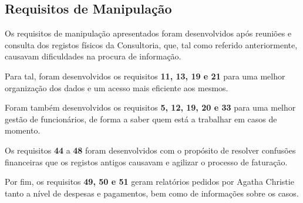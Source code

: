 \documentclass[a4paper,12pt]{scrreprt}
\begin{document}
        \clearpage


         \subsection{Requisitos de Manipulação}
         Os requisitos de manipulação apresentados foram desenvolvidos após reuniões e consulta dos registos físicos da Consultoria, que, tal como referido anteriormente, causavam dificuldades na procura de informação.
         
         Para tal, foram desenvolvidos os requisitos \textbf{11, 13, 19 e 21} para uma melhor organização dos dados e um acesso mais eficiente aos mesmos.
         
         Foram também desenvolvidos os requisitos \textbf{5, 12, 19, 20 e 33} para uma melhor gestão de funcionários, de forma a saber quem está a trabalhar em casos de momento.

         Os requisitos \textbf{44} a \textbf{48} foram desenvolvidos com o propósito de resolver confusões financeiras que os registos antigos causavam e agilizar o processo de faturação.

         Por fim, os requisitos \textbf{49, 50 e 51} geram relatórios pedidos por Agatha Christie tanto a nível de despesas e pagamentos, bem como de informações sobre os casos.

\end{document}
